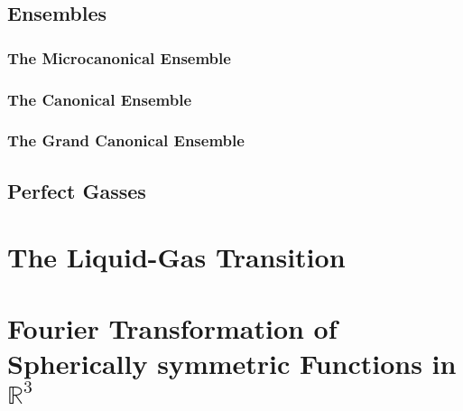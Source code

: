 \documentclass[a4paper,11pt]{article}
\begin{document}
\subsection{Ensembles}\label{sec:enembles}
\subsubsection{The Microcanonical Ensemble}
\subsubsection{The Canonical Ensemble}
\subsubsection{The Grand Canonical Ensemble}
\subsection{Perfect Gasses}\label{sec:perfect}


\section{The Liquid-Gas Transition}
\section{Fourier Transformation of Spherically symmetric Functions in $\mathbb{R}^3$}\label{sec:ft_3d}


\cite{hansen1990theory,mcquarrie2000statistical,
    press1992numerical, reif2009fundamentals,hill1986introduction}
\newpage


\end{document}
